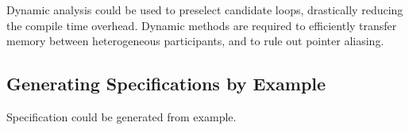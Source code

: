     Dynamic analysis could be used to preselect candidate loops, drastically
    reducing the compile time overhead.
    Dynamic methods are required to efficiently transfer memory between
    heterogeneous participants, and to rule out pointer aliasing.

\subsection{Generating Specifications by Example}

    Specification could be generated from example.
    



